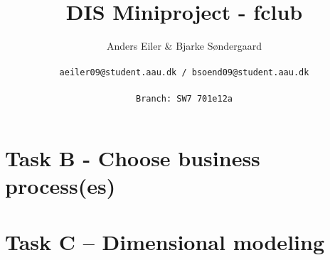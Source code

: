 \documentclass[a4paper,10pt]{article}
\title{DIS Miniproject - fclub}
\author{Anders Eiler \& Bjarke Søndergaard \\
\rule{0pt}{4ex}\texttt{aeiler09@student.aau.dk / bsoend09@student.aau.dk} \\
\rule{0pt}{4ex}\texttt{Branch: SW7 701e12a}}
\begin{document}
    \maketitle
    \newpage


     \section{Task B - Choose business process(es)}
     

     \section{Task C – Dimensional modeling}
     



\end{document}
